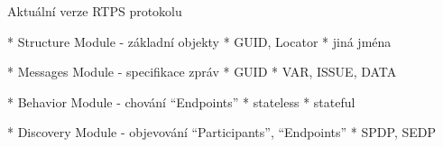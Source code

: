 \sec Aktuální verze RTPS protokolu

* Structure Module - základní objekty
\begitems
* GUID, Locator
* jiná jména
\enditems

* Messages Module - specifikace zpráv
\begitems
* GUID
* VAR, ISSUE, DATA
\enditems

* Behavior Module - chování ``Endpoints''
\begitems
* stateless
* stateful
\enditems

* Discovery Module - objevování ``Participants'', ``Endpoints''
\begitems
* SPDP, SEDP
\enditems

